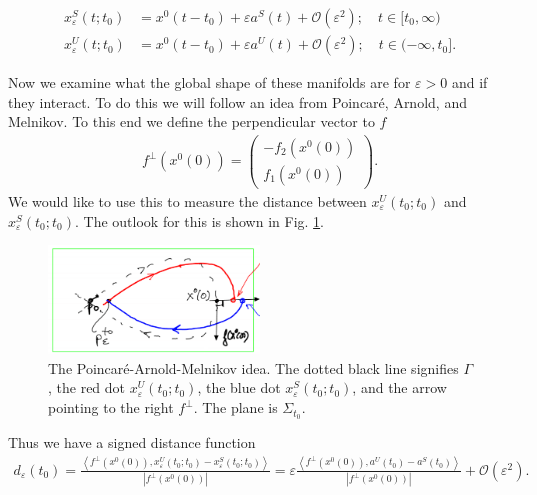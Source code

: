 \begin{subequations}
\begin{align}
	x_{\varepsilon}^{S}(t;t_0) &= x^{0}(t-t_0) + \varepsilon a^{S}(t) + \mathcal{O}(\varepsilon^{2} );\quad t\in [t_0,\infty ) \\
	x_{\varepsilon}^{U}(t;t_0) &= x^{0}(t-t_0) + \varepsilon a^{U}(t) + \mathcal{O}(\varepsilon^{2} );\quad t\in (-\infty, t_0].
\end{align}
\end{subequations}

Now we examine what the global shape of these manifolds are for $\varepsilon>0$ and if they interact. To do this we will follow an idea from Poincaré, Arnold, and Melnikov. To this end we define the perpendicular vector to $f$ 
\begin{align}
	f^{\perp}(x^{0}(0)) = 
	\begin{pmatrix}
		-f_2(x^{0}(0)) \\ f_1 (x^{0}(0))
	\end{pmatrix}
	.
\end{align}
We would like to use this to measure the distance between $x^{U}_{\varepsilon}(t_0;t_0)$ and $x^{S}_{\varepsilon}(t_0;t_0)$. The outlook for this is shown in Fig. \ref{fig:PAM_idea}.
\begin{figure}[h!]
	\centering
	\includegraphics[width=0.5\textwidth]{figures/ch6/10PAM_idea.png}
	\caption{The Poincaré-Arnold-Melnikov idea. The dotted black line signifies $\Gamma$, the red dot $x^{U}_{\varepsilon}(t_0;t_0)$, the blue dot $x^{S}_{\varepsilon}(t_0;t_0)$, and the arrow pointing to the right $f^{\perp}$. The plane is $\Sigma_{t_0}$.}
	\label{fig:PAM_idea}
\end{figure}
Thus we have a signed distance function
\begin{align}
	d_{\varepsilon}(t_0) = \frac{\left\langle f^{\perp}(x^{0}(0)), x^{U}_{\varepsilon}(t_0; t_0) - x^{S}_{\varepsilon}(t_0; t_0)\right\rangle}{\left| f^{\perp}(x^{0}(0))\right|} 
	= \varepsilon  \frac{\left\langle f^{\perp}(x^{0}(0)), a^{U}(t_0) - a^{S}(t_0) \right\rangle}{\left| f^{\perp}(x^{0}(0))\right|} + \mathcal{O}(\varepsilon^2).
\end{align}
